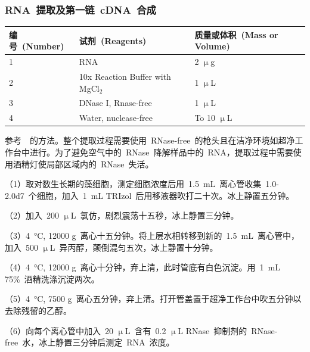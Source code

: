 \subsubsection{RNA\ 提取及第一链\ cDNA\ 合成}
\begin{table}[!ht]
\centering
{
\par}
\small
\begin{tabular*}{\textwidth}[c]{@{\extracolsep{\fill}}lll}
\toprule
编号\ (Number) & 试剂\ (Reagents) & 质量或体积\ (Mass or Volume)\\
\midrule
1 & RNA & 2 $\upmu$g\\
2 & 10x Reaction Buffer with MgCl$_2$ & 1 $\upmu$L\\
3 & DNase I, Rnase-free & 1 $\upmu$L\\
4 & Water, nuclease-free & To 10 $\upmu$L\\
\bottomrule
\end{tabular*}
\end{table}

参考\ \citet{Hu2014}\ 的方法。整个提取过程需要使用\ RNase-free\ 的枪头且在洁净环境如超净工作台中进行。为了避免空气中的\ RNase\ 降解样品中的\ RNA，提取过程中需要使用酒精灯使局部区域内的\ RNase\ 失活。

（1）取对数生长期的藻细胞，测定细胞浓度后用\ \SI{1.5}{\mL}\ 离心管收集\ 1.0-\num{2.0d7}\ 个细胞，加入\
\SI{1}{\mL} TRIzol\ 后用移液器吹打二十次。冰上静置五分钟。

（2）加入\ 200 $\upmu$L\ 氯仿，剧烈震荡十五秒，冰上静置三分钟。

（3）\SI{4}{\degreeCelsius}, 12000 g\ 离心十五分钟。将上层水相转移到新的\ \SI{1.5}{\mL}\ 离心管中，加入\ 500 $\upmu$L\ 异丙醇，颠倒混匀五次，冰上静置十分钟。

（4）\SI{4}{\degreeCelsius}, 12000 g\ 离心十分钟，弃上清，此时管底有白色沉淀。用\ \SI{1}{\mL} 75\%\ 酒精洗涤沉淀两次。

（5）\SI{4}{\degreeCelsius}, 7500 g\ 离心五分钟，弃上清。打开管盖置于超净工作台中吹五分钟以去除残留的乙醇。

（6）向每个离心管中加入\ 20 $\upmu$L\ 含有\ 0.2 $\upmu$L RNase\ 抑制剂的\ RNase-free\ 水，冰上静置三分钟后测定\ RNA\ 浓度。

